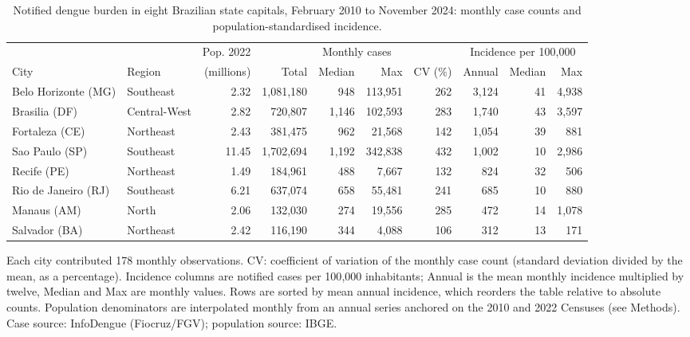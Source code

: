 \begin{table}[htbp]
\centering
\footnotesize
\setlength{\tabcolsep}{4pt}
\caption{Notified dengue burden in eight Brazilian state capitals, February 2010 to
November 2024: monthly case counts and population-standardised incidence.}
\label{tab:descriptive}
\begin{tabular}{llrrrrrrrr}
\toprule
 & & Pop. 2022 & \multicolumn{4}{c}{Monthly cases}
 & \multicolumn{3}{c}{Incidence per 100{,}000} \\
\cmidrule(lr){4-7} \cmidrule(lr){8-10}
City & Region & (millions) & Total & Median & Max & CV (\%)
 & Annual & Median & Max \\
\midrule
Belo Horizonte (MG) & Southeast & 2.32 & 1,081,180 & 948 & 113,951 & 262 & 3,124 & 41 & 4,938 \\
Brasilia (DF) & Central-West & 2.82 & 720,807 & 1,146 & 102,593 & 283 & 1,740 & 43 & 3,597 \\
Fortaleza (CE) & Northeast & 2.43 & 381,475 & 962 & 21,568 & 142 & 1,054 & 39 & 881 \\
Sao Paulo (SP) & Southeast & 11.45 & 1,702,694 & 1,192 & 342,838 & 432 & 1,002 & 10 & 2,986 \\
Recife (PE) & Northeast & 1.49 & 184,961 & 488 & 7,667 & 132 & 824 & 32 & 506 \\
Rio de Janeiro (RJ) & Southeast & 6.21 & 637,074 & 658 & 55,481 & 241 & 685 & 10 & 880 \\
Manaus (AM) & North & 2.06 & 132,030 & 274 & 19,556 & 285 & 472 & 14 & 1,078 \\
Salvador (BA) & Northeast & 2.42 & 116,190 & 344 & 4,088 & 106 & 312 & 13 & 171 \\
\bottomrule
\end{tabular}

\vspace{0.5em}
\begin{minipage}{\textwidth}
\footnotesize
Each city contributed 178 monthly observations. CV: coefficient of variation of the
monthly case count (standard deviation divided by the mean, as a percentage). Incidence
columns are notified cases per 100{,}000 inhabitants; Annual is the mean monthly
incidence multiplied by twelve, Median and Max are monthly values. Rows are sorted by
mean annual incidence, which reorders the table relative to absolute counts. Population
denominators are interpolated monthly from an annual series anchored on the 2010 and 2022
Censuses (see Methods). Case source: InfoDengue (Fiocruz/FGV); population source: IBGE.
\end{minipage}
\end{table}
